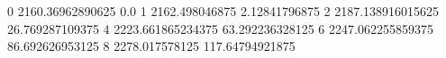 0 2160.36962890625 0.0
1 2162.498046875 2.12841796875
2 2187.138916015625 26.769287109375
4 2223.661865234375 63.292236328125
6 2247.062255859375 86.692626953125
8 2278.017578125 117.64794921875
